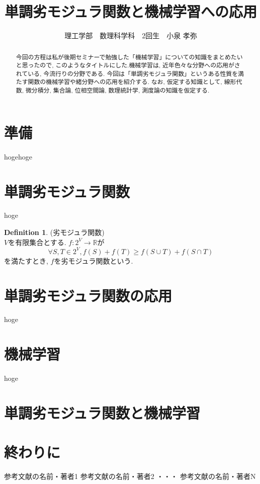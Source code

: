 \documentclass[11pt, a4paper]{jsarticle}
\title{単調劣モジュラ関数と機械学習への応用}
\author{理工学部　数理科学科　2回生　小泉 孝弥}
\date{}
\theoremstyle{definition}
\newtheorem{Definition+}{Definition}
\begin{document}
\maketitle
\begin{abstract}
今回の方程は私が後期セミナーで勉強した「機械学習」についての知識をまとめたいと思ったので, このようなタイトルにした.機械学習は, 近年色々な分野への応用がされている, 今流行りの分野である. 今回は「単調劣モジュラ関数」というある性質を満たす関数の機械学習や緒分野への応用を紹介する. なお, 仮定する知識として, 線形代数, 微分積分, 集合論, 位相空間論, 数理統計学, 測度論の知識を仮定する.
\end{abstract}
\section{準備}
hogehoge
\section{単調劣モジュラ関数}
hoge
\begin{Definition+}
(劣モジュラ関数)\\
$V$を有限集合とする. $f:2^{V}\to\mathbb{R}$が
\begin{equation*}
\forall S,T\in 2^V, f(S)+f(T) \geq f(S\cup T)+f(S\cap T)
\end{equation*}
を満たすとき, $f$を劣モジュラ関数という.
\end{Definition+}
\section{単調劣モジュラ関数の応用}
hoge
\section{機械学習}
hoge
\section{単調劣モジュラ関数と機械学習}
\section{終わりに}
\begin{thebibliography}{10}
   参考文献の名前・著者1
   参考文献の名前・著者2
  ・・・
   参考文献の名前・著者N
\end{thebibliography}
\end{document}
